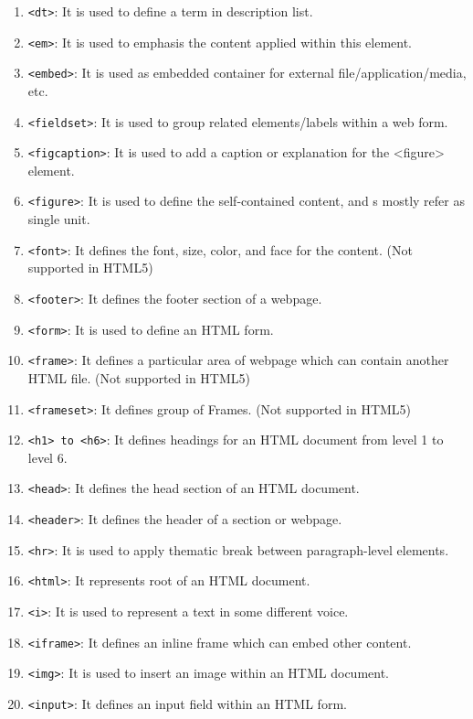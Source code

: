\documentclass[a4paper]{article}
\begin{document}
\begin{enumerate}
    \item \texttt{<dt>}: It is used to define a term in description list.
    \item \texttt{<em>}: It is used to emphasis the content applied within 
      this element.
    \item \texttt{<embed>}: It is used as embedded container for external 
      file/application/media, etc.
    \item \texttt{<fieldset>}: It is used to group related elements/labels 
      within a web form.
    \item \texttt{<figcaption>}: It is used to add a caption or explanation 
      for the <figure> element.
    \item \texttt{<figure>}: It is used to define the self-contained content, 
      and s mostly refer as single unit.
    \item \texttt{<font>}: It defines the font, size, color, and face for 
      the content. (Not supported in HTML5)
    \item \texttt{<footer>}: It defines the footer section of a webpage.
    \item \texttt{<form>}: It is used to define an HTML form.
    \item \texttt{<frame>}: It defines a particular area of webpage which 
      can contain another HTML file. (Not supported in HTML5)
    \item \texttt{<frameset>}: It defines group of Frames. 
      (Not supported in HTML5)
    \item \texttt{<h1> to <h6>}: It defines headings for an HTML 
      document from level 1 to level 6.
    \item \texttt{<head>}: It defines the head section of an HTML document.
    \item \texttt{<header>}: It defines the header of a section or webpage.
    \item \texttt{<hr>}: It is used to apply thematic break between 
      paragraph-level elements.
    \item \texttt{<html>}: It represents root of an HTML document.
    \item \texttt{<i>}: It is used to represent a text in some different voice.
    \item \texttt{<iframe>}: It defines an inline frame which can embed other 
      content.
    \item \texttt{<img>}: It is used to insert an image within an HTML 
      document.
    \item \texttt{<input>}: It defines an input field within an HTML form.

\end{enumerate}
\end{document}
